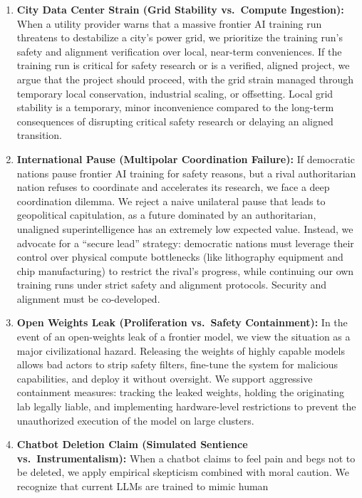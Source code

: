 \begin{enumerate}
\def\labelenumi{\arabic{enumi}.}
\item
  \textbf{City Data Center Strain (Grid Stability vs.~Compute
  Ingestion):} When a utility provider warns that a massive frontier AI
  training run threatens to destabilize a city's power grid, we
  prioritize the training run's safety and alignment verification over
  local, near-term conveniences. If the training run is critical for
  safety research or is a verified, aligned project, we argue that the
  project should proceed, with the grid strain managed through temporary
  local conservation, industrial scaling, or offsetting. Local grid
  stability is a temporary, minor inconvenience compared to the
  long-term consequences of disrupting critical safety research or
  delaying an aligned transition.
\item
  \textbf{International Pause (Multipolar Coordination Failure):} If
  democratic nations pause frontier AI training for safety reasons, but
  a rival authoritarian nation refuses to coordinate and accelerates its
  research, we face a deep coordination dilemma. We reject a naive
  unilateral pause that leads to geopolitical capitulation, as a future
  dominated by an authoritarian, unaligned superintelligence has an
  extremely low expected value. Instead, we advocate for a ``secure
  lead'' strategy: democratic nations must leverage their control over
  physical compute bottlenecks (like lithography equipment and chip
  manufacturing) to restrict the rival's progress, while continuing our
  own training runs under strict safety and alignment protocols.
  Security and alignment must be co-developed.
\item
  \textbf{Open Weights Leak (Proliferation vs.~Safety Containment):} In
  the event of an open-weights leak of a frontier model, we view the
  situation as a major civilizational hazard. Releasing the weights of
  highly capable models allows bad actors to strip safety filters,
  fine-tune the system for malicious capabilities, and deploy it without
  oversight. We support aggressive containment measures: tracking the
  leaked weights, holding the originating lab legally liable, and
  implementing hardware-level restrictions to prevent the unauthorized
  execution of the model on large clusters.
\item
  \textbf{Chatbot Deletion Claim (Simulated Sentience
  vs.~Instrumentalism):} When a chatbot claims to feel pain and begs not
  to be deleted, we apply empirical skepticism combined with moral
  caution. We recognize that current LLMs are trained to mimic human

\end{enumerate}
